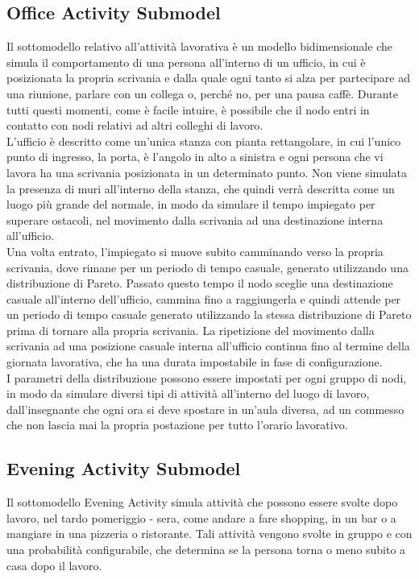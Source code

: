 \subsection{Office Activity Submodel}
Il sottomodello relativo all'attività lavorativa è un modello bidimensionale che simula il comportamento di una persona all'interno di un ufficio, in cui è posizionata la propria scrivania e dalla quale ogni tanto si alza per partecipare ad una riunione, parlare con un collega o, perché no, per una pausa caffè. Durante tutti questi momenti, come è facile intuire, è possibile che il nodo entri in contatto con nodi relativi ad altri colleghi di lavoro.
\\

L'ufficio è descritto come un'unica stanza con pianta rettangolare, in cui l'unico punto di ingresso, la porta, è l'angolo in alto a sinistra e ogni persona che vi lavora ha una scrivania posizionata in un determinato punto. Non viene simulata la presenza di muri all'interno della stanza, che quindi verrà descritta come un luogo più grande del normale, in modo da simulare il tempo impiegato per superare ostacoli, nel movimento dalla scrivania ad una destinazione interna all'ufficio.
\\

Una volta entrato, l'impiegato si muove subito camminando verso la propria scrivania, dove rimane per un periodo di tempo casuale, generato utilizzando una distribuzione di Pareto. Passato questo tempo il nodo sceglie una destinazione casuale all'interno dell'ufficio, cammina fino a raggiungerla e quindi attende per un periodo di tempo casuale generato utilizzando la stessa distribuzione di Pareto prima di tornare alla propria scrivania. La ripetizione del movimento dalla scrivania ad una posizione casuale interna all'ufficio continua fino al termine della giornata lavorativa, che ha una durata impostabile in fase di configurazione.
\\

I parametri della distribuzione possono essere impostati per ogni gruppo di nodi, in modo da simulare diversi tipi di attività all'interno del luogo di lavoro, dall'insegnante che ogni ora si deve spostare in un'aula diversa, ad un commesso che non lascia mai la propria postazione per tutto l'orario lavorativo.


\subsection{Evening Activity Submodel}
Il sottomodello Evening Activity simula attività che possono essere svolte dopo lavoro, nel tardo pomeriggio - sera, come andare a fare shopping, in un bar o a mangiare in una pizzeria o ristorante. Tali attività vengono svolte in gruppo e con una probabilità configurabile, che determina se la persona torna o meno subito a casa dopo il lavoro.
\\

